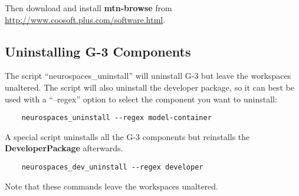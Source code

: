 \documentclass[12pt]{article}
\begin{document}
Then download and install {\bf mtn-browse} from
\href{http://www.coosoft.plus.com/software.html}{http://www.coosoft.plus.com/software.html}.


\subsection*{Uninstalling G-3 Components}

The script ``neurospaces\_uninstall'' will uninstall G-3 but leave the
workspaces unaltered.  The script will also uninstall the developer
package, so it can best be used with a ``--regex'' option to select
the component you want to uninstall:

\begin{verbatim}
    neurospaces_uninstall --regex model-container
\end{verbatim}

A special script uninstalls all the G-3 components but reinstalls the
{\bf DeveloperPackage} afterwards.

\begin{verbatim}
    neurospaces_dev_uninstall --regex developer
\end{verbatim}

Note that these commands leave the workspaces unaltered.
\end{document}

